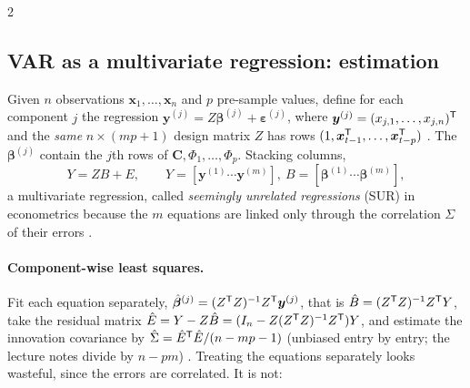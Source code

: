 \begin{paracol}{2}
\subsection{VAR as a multivariate regression: estimation}\label{ch09:sec-varest}
Given $n$ observations $\bm x_1,\dots,\bm x_n$ and $p$ pre-sample values, define for each component $j$ the regression
$\bm y^{(j)}=Z\bm\beta^{(j)}+\bm\varepsilon^{(j)}$, where $\bm y^{(j)}=(x_{j,1},\dots,x_{j,n})^{\mathsf T}$ and the \emph{same}
$n\times(mp+1)$ design matrix $Z$ has rows $(1,\bm x_{t-1}^{\mathsf T},\dots,\bm x_{t-p}^{\mathsf T})$ . The $\bm\beta^{(j)}$ contain the
$j$th rows of $\bm C,\Phi_1,\dots,\Phi_p$. Stacking columns,
\begin{equation}\label{ch09:eq-mvreg}
  Y=ZB+E,\qquad Y=[\bm y^{(1)}\cdots\bm y^{(m)}],\ B=[\bm\beta^{(1)}\cdots\bm\beta^{(m)}],
\end{equation}
a multivariate regression, called \emph{seemingly unrelated regressions} (SUR) in econometrics because the $m$ equations are
linked only through the correlation $\Sigma$ of their errors .

\paragraph{Component-wise least squares.} Fit each equation separately,
$\hat{\bm\beta}^{(j)}=(Z^{\mathsf T} Z)^{-1}Z^{\mathsf T}\bm y^{(j)}$, that is $\hat B=(Z^{\mathsf T} Z)^{-1}Z^{\mathsf T} Y$, take the residual matrix
$\hat E=Y-Z\hat B=(I_n-Z(Z^{\mathsf T} Z)^{-1}Z^{\mathsf T})Y$, and estimate the innovation covariance by
$\hat\Sigma=\hat E^{\mathsf T}\hat E/(n-mp-1)$ (unbiased entry by entry; the lecture notes divide by $n-pm$) .
Treating the equations separately looks wasteful, since the errors are correlated. It is not:


\end{paracol}
